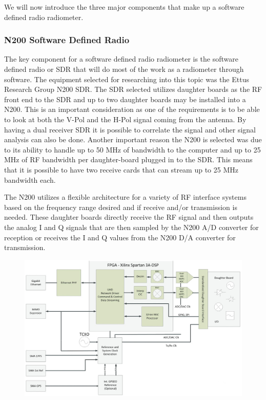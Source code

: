 We will now introduce the three major components that make up a software defined radio radiometer.  

\subsubsection{N200 Software Defined Radio} 
The key component for a software defined radio radiometer is the software defined radio or SDR that will do most of the work as a radiometer through software.  The equipment selected for researching into this topic was the Ettus Research Group N200 SDR.  The SDR selected utilizes daughter boards as the RF front end to the SDR and up to two daughter boards may be installed into a N200.  This is an important consideration as one of the requirements is to be able to look at both the V-Pol and the H-Pol signal coming from the antenna.  By having a dual receiver SDR it is possible to correlate the signal and other signal analysis can also be done.  Another important reason the N200 is selected was due to its ability to handle up to 50 MHz of bandwidth to the computer and up to 25 MHz of RF bandwidth per daughter-board plugged in to the SDR.  This means that it is possible to have two receive cards that can stream up to 25 MHz bandwidth each.  

The N200 utilizes a flexible architecture for a variety of RF interface systems based on the frequency range desired and if receive and/or transmission is needed.  These daughter boards directly receive the RF signal and then outputs the analog I and Q signals that are then sampled by the N200 A/D converter for reception or receives the I and Q values from the N200 D/A converter for transmission. 

{\begin{figure}[h!tb] 
\centering
\includegraphics[width=14cm]{Images/n200_block_edited}
\label{N200_block}
\end{figure}
}

